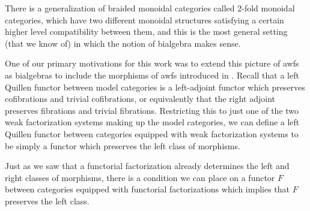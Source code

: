 There is a generalization of braided monoidal categories called 2-fold monoidal categories, which have two different monoidal structures satisfying a certain higher level compatibility between them, and this is the most general setting (that we know of) in which the notion of bialgebra makes sense.

One of our primary motivations for this work was to extend this picture of awfs as bialgebras to include the morphisms of awfs introduced in \cite{riehl:nwfs-model}. Recall that a left Quillen functor between model categories is a left-adjoint functor which preserves cofibrations and trivial cofibrations, or equivalently that the right adjoint preserves fibrations and trivial fibrations. Restricting this to just one of the two weak factorization systems making up the model categories, we can define a left Quillen functor between categories equipped with weak factorization systems to be simply a functor which preserves the left class of morphisms.

Just as we saw that a functorial factorization already determines the left and right classes of morphisms, there is a condition we can place on a functor $F$ between categories equipped with functorial factorizations which implies that $F$ preserves the left class.

